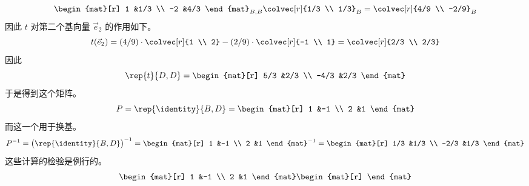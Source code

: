 \begin{exercises}
\begin{answer}
\begin{equation*}
\begin{mat}[r]
                     1  &1/3  \\
                    -2  &4/3
                  \end{mat}_{B,B}
                  \colvec[r]{1/3 \\ 1/3}_B
                  =
                  \colvec[r]{4/9 \\ -2/9}_B
        \end{equation*}
        因此 $t$ 对第二个基向量 $\vec{e}_2$ 的作用如下。
        \begin{equation*}
          t(\vec{e}_2)
          =(4/9)\cdot\colvec[r]{1 \\ 2}-(2/9)\cdot\colvec[r]{-1 \\ 1}
          =\colvec[r]{2/3 \\ 2/3}
        \end{equation*}
        因此
        \begin{equation*}
           \rep{t}{D,D}=
           \begin{mat}[r]
              5/3  &2/3  \\
             -4/3  &2/3
           \end{mat}
        \end{equation*}
        于是得到这个矩阵。
        \begin{equation*}
          P=\rep{\identity}{B,D}
          =\begin{mat}[r]
            1  &-1  \\
            2  &1 
          \end{mat}
        \end{equation*}
       而这一个用于换基。 
       \begin{equation*}
          P^{-1}=\bigl(\rep{\identity}{B,D}\bigr)^{-1}
          =\begin{mat}[r]
             1  &-1 \\
             2  &1
          \end{mat}^{-1}
          =
          \begin{mat}[r]
            1/3  &1/3  \\
            -2/3 &1/3
          \end{mat}
       \end{equation*}
       这些计算的检验是例行的。
       \begin{equation*}
          \begin{mat}[r]
             1  &-1 \\
             2  &1
          \end{mat}
          \begin{mat}[r]

\end{mat}
\end{equation*}
\end{answer}
\end{exercises}
